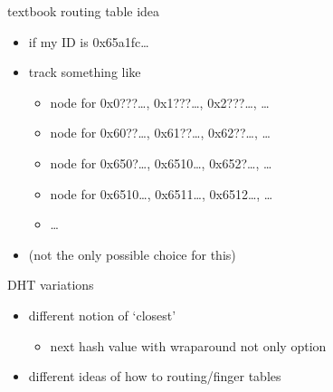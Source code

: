 \begin{frame}{textbook routing table idea}
    \begin{itemize}
    \item if my ID is 0x65a1fc\ldots
    \item track something like
        \begin{itemize}
        \item node for 0x0???\ldots, 0x1???\ldots, 0x2???\ldots, \ldots
        \item node for 0x60??\ldots, 0x61??\ldots, 0x62??\ldots, \ldots
        \item node for 0x650?\ldots, 0x6510\ldots, 0x652?\ldots, \ldots
        \item node for 0x6510\ldots, 0x6511\ldots, 0x6512\ldots, \ldots
        \item \ldots
        \end{itemize}
    \item (not the only possible choice for this)
    \end{itemize}
\end{frame}

\begin{frame}{DHT variations}
    \begin{itemize}
    \item different notion of `closest' 
        \begin{itemize}
        \item next hash value with wraparound not only option
        \end{itemize}
    \item different ideas of how to routing/finger tables
    \end{itemize}
\end{frame}
